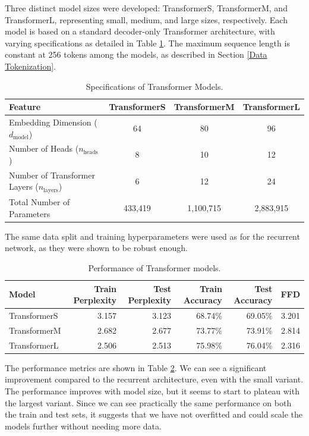 \documentclass{article}
\begin{document}
Three distinct model sizes were developed: TransformerS, TransformerM, and TransformerL, representing small, medium, and large sizes, respectively. Each model is based on a standard decoder-only Transformer architecture, with varying specifications as detailed in Table \ref{tab:transformer_specs}. The maximum sequence length is constant at 256 tokens among the models, as described in Section \ref{Data Tokenization}.

\begin{table}[!htbp]
    \centering
    \begin{tabular}{lccc}
        \toprule
        Feature & TransformerS & TransformerM & TransformerL \\
        \midrule
        Embedding Dimension (\(d_{\text{model}}\)) & 64 & 80 & 96 \\
        Number of Heads (\(n_{\text{heads}}\)) & 8 & 10 & 12 \\
        Number of Transformer Layers (\(n_{\text{layers}}\)) & 6 & 12 & 24 \\
        Total Number of Parameters & 433,419 & 1,100,715 & 2,883,915 \\
        \bottomrule
    \end{tabular}
    \caption{Specifications of Transformer Models.}
    \label{tab:transformer_specs}
\end{table}

The same data split and training hyperparameters were used as for the recurrent network, as they were shown to be robust enough.

\begin{table}[!htbp]
    \centering
    \begin{tabular}{lrrrrr}
        \toprule
        Model & Train Perplexity & Test Perplexity & Train Accuracy & Test Accuracy & FFD \\
        \midrule
        TransformerS & 3.157 & 3.123 & 68.74\% & 69.05\% & 3.201 \\
        TransformerM & 2.682 & 2.677 & 73.77\% & 73.91\% & 2.814 \\
        TransformerL & 2.506 & 2.513 & 75.98\% & 76.04\% & 2.316 \\
        \bottomrule
    \end{tabular}
    \caption{Performance of Transformer models.}
    \label{tab:transformer_performance}
\end{table}

The performance metrics are shown in Table \ref{tab:transformer_performance}. We can see a significant improvement compared to the recurrent architecture, even with the small variant. The performance improves with model size, but it seems to start to plateau with the largest variant. Since we can see practically the same performance on both the train and test sets, it suggests that we have not overfitted and could scale the models further without needing more data.
\end{document}
